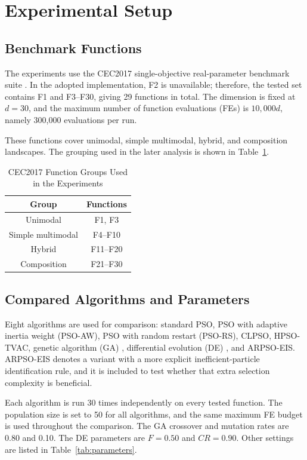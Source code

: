 \documentclass[conference]{IEEEtran}
\begin{document}
\section{Experimental Setup}\label{sec:experiment}

\subsection{Benchmark Functions}
The experiments use the CEC2017 single-objective real-parameter benchmark suite \cite{b5}. In the adopted implementation, F2 is unavailable; therefore, the tested set contains F1 and F3--F30, giving 29 functions in total. The dimension is fixed at $d=30$, and the maximum number of function evaluations (FEs) is $10{,}000d$, namely 300,000 evaluations per run.

These functions cover unimodal, simple multimodal, hybrid, and composition landscapes. The grouping used in the later analysis is shown in Table~\ref{tab:function_groups}.

\begin{table}[!t]
    \caption{CEC2017 Function Groups Used in the Experiments}
    \centering
    \begin{tabular}{cc}
        \toprule
        Group             & Functions \\
        \midrule
        Unimodal          & F1, F3    \\
        Simple multimodal & F4--F10   \\
        Hybrid            & F11--F20  \\
        Composition       & F21--F30  \\
        \bottomrule
    \end{tabular}
    \label{tab:function_groups}
\end{table}

\subsection{Compared Algorithms and Parameters}
Eight algorithms are used for comparison: standard PSO, PSO with adaptive inertia weight (PSO-AW), PSO with random restart (PSO-RS), CLPSO, HPSO-TVAC, genetic algorithm (GA) \cite{b6}, differential evolution (DE) \cite{b7}, and ARPSO-EIS. ARPSO-EIS denotes a variant with a more explicit inefficient-particle identification rule, and it is included to test whether that extra selection complexity is beneficial.

Each algorithm is run 30 times independently on every tested function. The population size is set to 50 for all algorithms, and the same maximum FE budget is used throughout the comparison. The GA crossover and mutation rates are 0.80 and 0.10. The DE parameters are $F=0.50$ and $CR=0.90$. Other settings are listed in Table~\ref{tab:parameters}.
\end{document}
